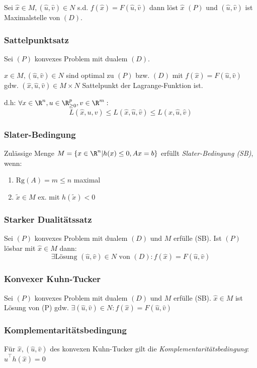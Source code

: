 Sei \(\hat x \in M, (\hat u, \hat v) \in N\) s.d. \(f(\hat x) = F(\hat u, \hat v)\) dann löst \(\hat x\) \((P)\) und \((\hat u, \hat v)\) ist Maximalstelle von \((D)\).

\subsubsection*{Sattelpunktsatz}

Sei \((P)\) konvexes Problem mit dualem \((D)\).

\(\hat x \in M, (\hat u, \hat v) \in N\) sind optimal zu \((P)\) bzw. \((D)\) mit \(f(\hat x) = F(\hat u, \hat v)\) gdw. \((\hat x, \hat u, \hat v) \in M \times N\) Sattelpunkt der Lagrange-Funktion ist.

d.h: \(\forall x \in \R^n, u \in \R_{\geq 0}^p, v \in \R^m :\) \[L(\hat x,u,v) \leq L(\hat x,\hat u,\hat v) \leq L(x,\hat u,\hat v)\]

\subsubsection*{Slater-Bedingung}

Zulässige Menge \(M = \{x \in \R^n | h(x) \leq 0, Ax=b\}\) erfüllt \emph{Slater-Bedingung (SB)}, wenn:

\begin{enumerate}[label=(\roman*)]
	\item \(\text{Rg}(A) = m \leq n\) maximal
	\item \(\tilde x \in M\) ex. mit \(h(\tilde x) < 0\)
\end{enumerate}

\subsubsection*{Starker Dualitätssatz}

Sei \((P)\) konvexes Problem mit dualem \((D)\) und \(M\) erfülle (SB). Ist \((P)\) lösbar mit \(\hat x \in M\) dann:
\[\exists \text{Lösung } (\hat u,\hat v) \in N \text{ von } (D) : f(\hat x) = F(\hat u,\hat v)\]

\subsubsection*{Konvexer Kuhn-Tucker}

Sei \((P)\) konvexes Problem mit dualem \((D)\) und \(M\) erfülle (SB).
\(\hat x \in M\) ist Lösung von (P) gdw. \(\exists (\hat u,\hat v) \in N : f(\hat x) = F(\hat u,\hat v)\)

\subsubsection*{Komplementaritätsbedingung}

Für \(\hat x, (\hat u,\hat v)\) des konvexen Kuhn-Tucker gilt die \emph{Komplementaritätsbedingung}: \(\hat u^\top h(\hat x) = 0\)

